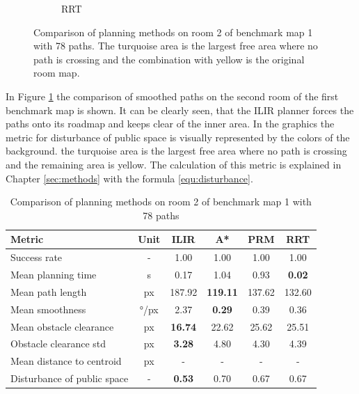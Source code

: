 \begin{figure}[h]
\begin{subfigure}{.25\textwidth}
      \caption{RRT}
    \end{subfigure}
    \caption[Comparison of planning methods on room 2 of benchmark map 1 with 78 paths]{Comparison of planning methods on room 2 of benchmark map 1 with 78 paths. The turquoise area is the largest free area where no path is crossing and the combination with yellow is the original room map.}
    \label{fig:ryu_room2_comparison}
\end{figure}

In Figure \ref{fig:ryu_room2_comparison} the comparison of smoothed paths on the second room of the first benchmark map is shown. It can be clearly seen, that the ILIR planner forces the paths onto its roadmap and keeps clear of the inner area. In the graphics the metric for disturbance of public space is visually represented by the colors of the background. the turquoise area is the largest free area where no path is crossing and the remaining area is yellow. The calculation of this metric is explained in Chapter \ref{sec:methods} with the formula \ref{equ:disturbance}.

\begin{table}[ht]
\centering
\begin{tabular}{lc|cccc}
\hline
\textbf{Metric} & \textbf{Unit} & \textbf{ILIR} & \textbf{A*} & \textbf{PRM} & \textbf{RRT} \\
\hline
Success rate & - & 1.00 & 1.00 & 1.00 & 1.00 \\
Mean planning time & s & 0.17 & 1.04 & 0.93 & \textbf{0.02} \\
Mean path length & px & 187.92 & \textbf{119.11} & 137.62 & 132.60 \\
Mean smoothness & °/px & 2.37 & \textbf{0.29} & 0.39 & 0.36 \\
Mean obstacle clearance & px & \textbf{16.74} & 22.62 & 25.62 & 25.51 \\
Obstacle clearance std & px & \textbf{3.28} & 4.80 & 4.30 & 4.39 \\
Mean distance to centroid & px & - & - & - & - \\
Disturbance of public space & - & \textbf{0.53} & 0.70 & 0.67 & 0.67 \\
\hline
\end{tabular}
\caption{Comparison of planning methods on room 2 of benchmark map 1 with 78 paths}
\label{tab:room2_results}
\end{table}

